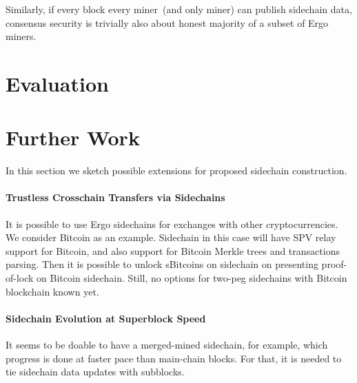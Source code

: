 \documentclass{article}   %
\newcommand{\authnote}[2]{\marginpar{\parbox{\marginparwidth}{\tiny %
  \textsf{#1 {\textcolor{blue}{notes: #2}}}}}%
  \textcolor{blue}{\textbf{\dag}}}
\newcommand{\authnote}[2]{
  \textsf{#1 \textcolor{blue}{: #2}}}
\newcommand{\authnote}[2]{}
\newcommand{\knote}[1]{{\authnote{\textcolor{green}{kushti notes}}{#1}}}
\begin{document}
Similarly, if every block every miner~(and only miner) can publish sidechain data, consensus security is
trivially also about honest majority of a subset of Ergo miners.

\section{Evaluation}

\knote{Fill with tests data}

\section{Further Work}

In this section we sketch possible extensions for proposed sidechain construction.

\paragraph{Trustless Crosschain Transfers via Sidechains}

It is possible to use Ergo sidechains for exchanges with other cryptocurrencies. We consider Bitcoin as an
example. Sidechain in this case will have SPV relay support for Bitcoin, and also support for Bitcoin Merkle trees and
transactions parsing. Then it is possible to unlock sBitcoins on sidechain on presenting proof-of-lock on Bitcoin
sidechain. Still, no options for two-peg sidechains with Bitcoin blockchain known yet.

\paragraph{Sidechain Evolution at Superblock Speed}

It seems to be doable to have a merged-mined sidechain, for example, which progress is done at faster pace
than main-chain blocks. For that, it is needed to tie sidechain data updates with subblocks.

\newpage

 
\end{document}

